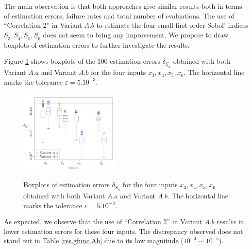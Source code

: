 The main observation is that both approaches give similar results both in terms of estimation errors, failure rates and total number of evaluations. The use of ``Correlation 2'' in Variant $A.b$ to estimate the four small first-order Sobol' indices $\underline{S}_3, \underline{S}_4, \underline{S}_5, \underline{S}_6$ does not seem to bring any improvement. We propose to draw boxplots of estimation errors to further investigate the results. 

Figure \ref{boxplots.gfunc} shows boxplots of the $100$ estimation errors $\delta_{\underline{S}_u}$ obtained with both Variant $A.a$ and Variant $A.b$ for the four inputs $x_3,x_4,x_5,x_6$. The horizontal line marks the tolerance $\varepsilon=5.10^{-3}$.
\begin{figure}[!ht]
\caption{Boxplots of estimation errors $\delta_{\underline{S}_u}$ for the four inputs $x_3,x_4,x_5,x_6$ obtained with both Variant $A.a$ and Variant $A.b$. The horizontal line marks the tolerance $\varepsilon=5.10^{-3}$.}
\centering
\includegraphics[width=0.45\textwidth]{Images/boxplots.pdf}
\label{boxplots.gfunc}
\end{figure}
As expected, we observe that the use of ``Correlation 2'' in Variant $A.b$ results in lower estimation errors for these four inputs. The discrepancy observed does not stand out in Table \ref{res.gfunc.Ab} due to its low magnitude ($10^{-4} \sim 10^{-5}$).
\bigskip

